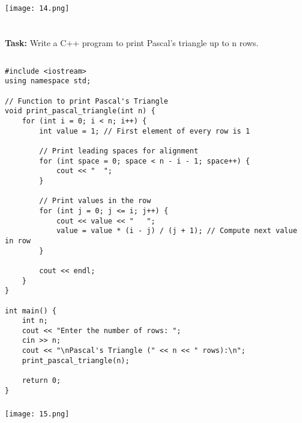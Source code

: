 \documentclass[12pt,a4paper]{article}
\begin{document}
\subsubsection{}
\begin{center}
    \texttt{[image: 14.png]}
\end{center}


\section{}
\textbf{Task:} Write a C++ program to print Pascal’s triangle up to n rows.

\subsection{}
\begin{lstlisting}
#include <iostream>
using namespace std;

// Function to print Pascal's Triangle
void print_pascal_triangle(int n) {
    for (int i = 0; i < n; i++) {
        int value = 1; // First element of every row is 1
        
        // Print leading spaces for alignment
        for (int space = 0; space < n - i - 1; space++) {
            cout << "  ";
        }

        // Print values in the row
        for (int j = 0; j <= i; j++) {
            cout << value << "   ";
            value = value * (i - j) / (j + 1); // Compute next value in row
        }

        cout << endl;
    }
}

int main() {
    int n;
    cout << "Enter the number of rows: ";
    cin >> n;
    cout << "\nPascal's Triangle (" << n << " rows):\n";
    print_pascal_triangle(n);

    return 0;
}

\end{lstlisting}

\subsubsection{}
\begin{center}
    \texttt{[image: 15.png]}
\end{center}
\end{document}
